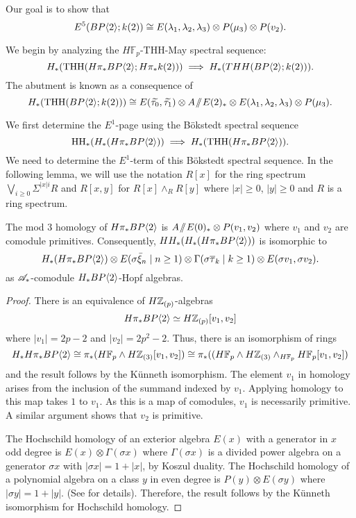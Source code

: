 Our goal is to show that 
\[
E^5(BP\langle 2 \rangle;k(2))\cong E(\lambda_1, \lambda_2, \lambda_3)\otimes P(\mu_3)\otimes P(v_2).
\]

We begin by analyzing the $H\mathbb{F}_p$-THH-May spectral sequence:
\begin{equation}\label{HBk(2)}
H_*(\operatorname{THH}(H\pi_*BP\langle 2 \rangle;H\pi_*k(2)))\implies H_*(THH(BP\langle 2 \rangle;k(2))).
\end{equation}
The abutment is known as a consequence of \cite{AngeltveitRognes}
\[
H_*(\operatorname{THH}(BP\langle 2 \rangle;k(2)))\cong E(\widetilde{\tau_0}, \widetilde{\tau_1})\otimes A\! \sslash \! E(2)_*\otimes E(\lambda_1,\lambda_2, \lambda_3)\otimes P(\mu_3).
\]

We first determine the $E^1$-page using the B\"okstedt spectral sequence
\[
\operatorname{HH}_*(H_*(H\pi_*BP\langle 2 \rangle))\implies H_*( \operatorname{THH}(H\pi_*BP\langle 2 \rangle)).
\]
We need to determine the $E^1$-term of this B\"okstedt spectral sequence. In the following lemma, we will use the notation $R[x]$ for the ring spectrum $\bigvee_{i\ge 0} \Sigma^{|x|i}R$ and $R[x,y]$ for $R[x]\wedge_{R}R[y]$ where $|x|\ge0$, $|y|\ge0$ and $R$ is a ring spectrum. 
\begin{lem}
	The mod 3 homology of $H\pi_*BP\langle 2 \rangle$ is $A\! \sslash \! E(0)_*\otimes P(v_1, v_2)$ where $v_1$ and $v_2$ are comodule primitives. Consequently, 
	$HH_*(H_*(H\pi_*BP\langle 2 \rangle))$ is isomorphic to  
\[
H_*(H\pi_*BP\langle 2 \rangle)\otimes E(\sigma\bar{\xi}_n\mid n\geq 1)\otimes \Gamma(\sigma\overline{\tau}_k\mid k\geq 1)\otimes E(\sigma v_1, \sigma v_2).
\]
as $\mathscr{A}_*$-comodule $H_*BP\langle 2 \rangle$-Hopf algebras. 
\end{lem}
\begin{proof}
	There is an equivalence of $H\mathbb{Z}_{(p)}$-algebras
	\[
	H\pi_*BP\langle 2 \rangle\simeq  H\mathbb{Z}_{(p)}[v_1,v_2]
	\]
	where $|v_1|=2p-2$ and $|v_2|=2p^2-2$.
	Thus, there is an isomorphism of rings
	\[ H_*H\pi_*BP\langle 2 \rangle\cong \pi_*(H\mathbb{F}_p \wedge  H\mathbb{Z}_{(3)}[v_1,v_2])\cong  \pi_* ( (H\mathbb{F}_p\wedge H\mathbb{Z}_{(3)}\wedge_{H\mathbb{F}_p} H\mathbb{F}_p[v_1,v_2]) \]
	and the result follows by the K\"unneth isomorphism. 
	The element $v_1$ in homology arises from the inclusion of the summand indexed by $v_1$. Applying homology to this map takes $1$ to $v_1$. As this is a map of comodules, $v_1$ is necessarily primitive. A similar argument shows that $v_2$ is primitive.
	
The Hochschild homology of an exterior algebra $E(x)$ with a generator in $x$ odd degree is $E(x)\otimes \Gamma(\sigma x)$ where $\Gamma(\sigma x)$ is a divided power algebra on a generator $\sigma x$ with $|\sigma x|=1+|x|$, by Koszul duality. The Hochschild homology of a polynomial algebra on a class $y$ in even degree is $P(y)\otimes E(\sigma y)$ where $|\sigma y|=1+|y|$. (See \cite{McClureStaffeldt} for details). Therefore, the result follows by the K\"unneth isomorphism for Hochschild homology. 
\end{proof}

